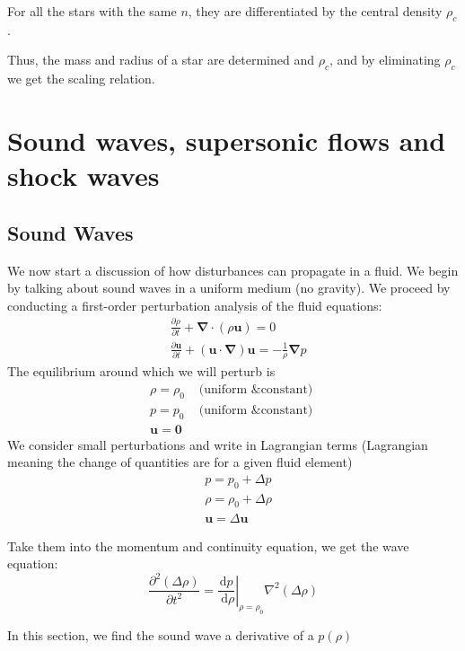 \documentclass[12pt,a4paper]{article}
\begin{document}
        For all the stars with the same $n$, they are differentiated by the central density $\rho_c$. 

        Thus, the mass and radius of a star are
        determined and $\rho_c$, and by eliminating $\rho_c$ we get the scaling relation.
        
\section{Sound waves, supersonic flows and shock waves}
\subsection{Sound Waves}
    We now start a discussion of how disturbances can propagate in a fluid. We begin by talking about sound waves in a uniform medium (no gravity). We proceed by conducting a first-order perturbation analysis of the fluid equations:
    $$
    \begin{aligned}
    & \frac{\partial \rho}{\partial t}+\boldsymbol{\nabla} \cdot(\rho \mathbf{u})=0 \\
    & \frac{\partial \mathbf{u}}{\partial t}+(\mathbf{u} \cdot \boldsymbol{\nabla}) \mathbf{u}=-\frac{1}{\rho} \boldsymbol{\nabla} p
    \end{aligned}
    $$
    The equilibrium around which we will perturb is
    $$
    \begin{array}{ll}
    \rho=\rho_0 & \text { (uniform \& constant) } \\
    p=p_0 & \text { (uniform \& constant) } \\
    \mathbf{u}=\mathbf{0} &
    \end{array}
    $$
    We consider small perturbations and write in Lagrangian terms (Lagrangian meaning the change of quantities are for a given fluid element)
    $$
    \begin{aligned}
    & p=p_0+\Delta p \\
    & \rho=\rho_0+\Delta \rho \\
    & \mathbf{u}=\Delta \mathbf{u}
    \end{aligned}
    $$

    Take them into the momentum and continuity equation, we get the wave equation:
    $$
    \frac{\partial^2(\Delta \rho)}{\partial t^2}=\left.\frac{\mathrm{d} p}{\mathrm{~d} \rho}\right|_{\rho=\rho_0} \nabla^2(\Delta \rho)
    $$

    In this section, we find the sound wave a derivative of a $p(\rho)$
\end{document}
